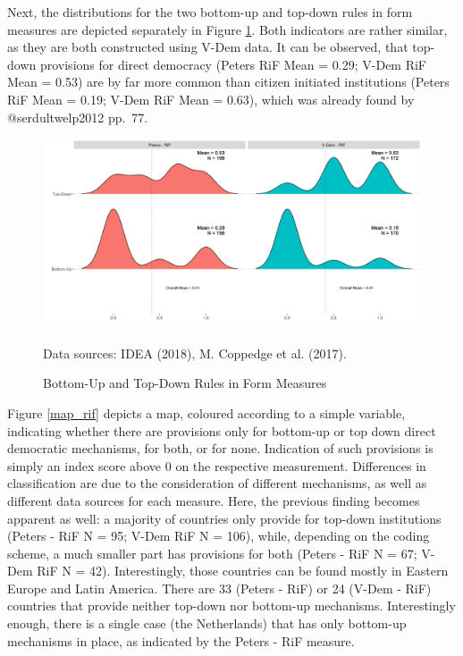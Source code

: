 \documentclass[]{article}
\begin{document}
Next, the distributions for the two bottom-up and top-down rules in form
measures are depicted separately in Figure \ref{type_rif}. Both
indicators are rather similar, as they are both constructed using V-Dem
data. It can be observed, that top-down provisions for direct democracy
(Peters RiF Mean = 0.29; V-Dem RiF Mean = 0.53) are by far more common
than citizen initiated institutions (Peters RiF Mean = 0.19; V-Dem RiF
Mean = 0.63), which was already found by @serdultwelp2012 pp.~77.

\begin{figure}[!th]
\caption{Bottom-Up and Top-Down Rules in Form Measures}
    \label{type_rif}
    \includegraphics[width=\textwidth]{images/type_rif.png}
    \flushright
    {\scriptsize Data sources: IDEA (2018), M. Coppedge et al. (2017). \par}
\end{figure}

Figure \ref{map_rif} depicts a map, coloured according to a simple
variable, indicating whether there are provisions only for bottom-up or
top down direct democratic mechanisms, for both, or for none. Indication
of such provisions is simply an index score above 0 on the respective
measurement. Differences in classification are due to the consideration
of different mechanisms, as well as different data sources for each
measure. Here, the previous finding becomes apparent as well: a majority
of countries only provide for top-down institutions (Peters - RiF N =
95; V-Dem RiF N = 106), while, depending on the coding scheme, a much
smaller part has provisions for both (Peters - RiF N = 67; V-Dem RiF N =
42). Interestingly, those countries can be found mostly in Eastern
Europe and Latin America. There are 33 (Peters - RiF) or 24 (V-Dem -
RiF) countries that provide neither top-down nor bottom-up mechanisms.
Interestingly enough, there is a single case (the Netherlands) that has
only bottom-up mechanisms in place, as indicated by the Peters - RiF
measure.
\end{document}
